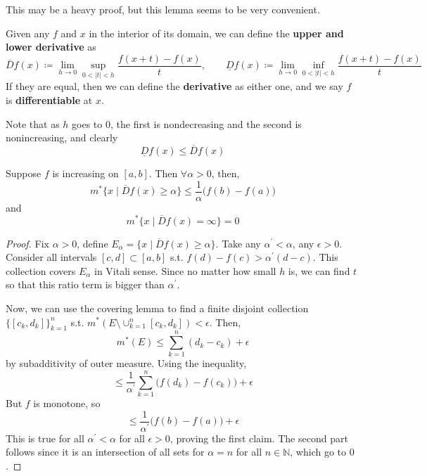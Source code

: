   This may be a heavy proof, but this lemma seems to be very convenient. 

  \begin{definition}[Derivative]
    Given any $f$ and $x$ in the interior of its domain, we can define the \textbf{upper and lower derivative} as
    \begin{equation}
      \overline{D} f(x) \coloneqq \lim_{h \to 0} \sup_{0 < |t| < h} \frac{f(x + t) - f(x)}{t}, \qquad \underline{D} f(x) \coloneqq \lim_{h \to 0} \inf_{0 < |t| < h} \frac{f(x + t) - f(x)}{t} 
    \end{equation}
    If they are equal, then we can define the \textbf{derivative} as either one, and we say $f$ is \textbf{differentiable} at $x$. 
  \end{definition}

  Note that as $h$ goes to $0$, the first is nondecreasing and the second is nonincreasing, and clearly 
  \begin{equation}
    \underline{D} f(x) \leq \overline{D} f(x)
  \end{equation}

  \begin{lemma} 
    Suppose $f$ is increasing on $[a, b]$. Then $\forall \alpha > 0$, then, 
    \begin{equation}
      m^\ast \{ x \mid \overline{D} f(x) \geq \alpha \} \leq \frac{1}{\alpha} \big( f(b) - f(a) \big)
    \end{equation}
    and 
    \begin{equation}
      m^\ast \{ x \mid \overline{D} f(x) = \infty\} = 0
    \end{equation}
  \end{lemma}
  \begin{proof}
    Fix $\alpha > 0$, define $E_\alpha = \{ x \mid \overline{D} f(x) \geq \alpha\}$. Take any $\alpha^\prime < \alpha$, any $\epsilon > 0$. Consider all intervals $[c, d] \subset [a, b]$ s.t. $f(d) - f(c) > \alpha^\prime (d - c)$. This collection covers $E_\alpha$ in Vitali sense. Since no matter how small $h$ is, we can find $t$ so that this ratio term is bigger than $\alpha^\prime$. 

    Now, we can use the covering lemma to find a finite disjoint collection $\{[c_k, d_k]\}_{k=1}^n$ s.t. $m^\ast ( E \setminus \cup_{k=1}^n [c_k, d_k]) < \epsilon$. Then, 
    \begin{equation}
      m^\ast (E) \leq \sum_{k=1}^n (d_k - c_k) + \epsilon 
    \end{equation}
    by subadditivity of outer measure. Using the inequality, 
    \begin{equation}
      \leq \frac{1}{\alpha^\prime} \sum_{k=1}^n \big( f(d_k) - f(c_k) \big) + \epsilon
    \end{equation}
    But $f$ is monotone, so 
    \begin{equation}
      \leq \frac{1}{\alpha^\prime} \big( f(b) - f(a) \big) + \epsilon
    \end{equation}
    This is true for all $\alpha^\prime < \alpha$ for all $\epsilon > 0$, proving the first claim. The second part follows since it is an intersection of all sets for $\alpha = n$ for all $n \in \mathbb{N}$, which go to $0$. 
  \end{proof}

